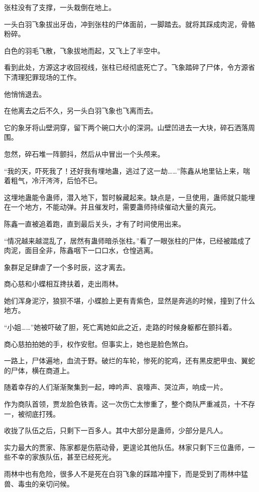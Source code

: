 \begin{this_body}
张柱没有了支撑，一头栽倒在地上。

一头白羽飞象拔出牙齿，冲到张柱的尸体面前，一脚踏去。就将其踩成肉泥，骨骼粉碎。

白色的羽毛飞散，飞象拔地而起，又飞上了半空中。

看到此处，方源这才收回视线，张柱已经彻底死亡了。飞象踏碎了尸体，令方源省下清理犯罪现场的工作。

他悄悄退去。

在他离去之后不久，另一头白羽飞象也飞离而去。

它的象牙将山壁洞穿，留下两个碗口大小的深洞。山壁凹进去一大块，碎石洒落周围。

忽然，碎石堆一阵颤抖，然后从中冒出一个头颅来。

“我的天，吓死我了！还好我有埋地蛊，逃过了这一劫……”陈鑫从地里钻上来，喘着粗气，冷汗涔涔，后怕不已。

这埋地蛊能令蛊师，潜入地下，暂时躲藏起来。缺点是，一旦使用，蛊师就只能埋在一个地方，不能动弹。并且催发时，需要蛊师持续催动大量的真元。

陈鑫一直被追着跑，直到最后关头，才有了时间使用出来。

“情况越来越混乱了，居然有蛊师暗杀张柱。”看了一眼张柱的尸体，已经被踏成了肉泥，面目全非，陈鑫咽下一口口水，仓惶逃离。

象群足足肆虐了一个多时辰，这才离去。

商心慈和小蝶相互搀扶着，走出雨林。

她们浑身泥泞，狼狈不堪，小蝶脸上更有青紫色，显然是奔逃的时候，撞到了什么地方。

“小姐……”她被吓破了胆，死亡离她如此之近，走路的时候身躯都在颤抖着。

商心慈拍拍她的手，权作安慰。但事实上，她也是脸色煞白。

一路上，尸体遍地，血流于野。破烂的车轮，惨死的驼鸡，还有黑皮肥甲虫、翼蛇的尸体，横在商道上。

随着幸存的人们渐渐聚集到一起，呻吟声、哀嚎声、哭泣声，响成一片。

作为商队首领，贾龙脸色铁青。这一次伤亡太惨重了，整个商队严重减员，十不存一，被彻底打残。

收拢了队伍之后，只剩下一百多人。其中大部分是蛊师，少部分是凡人。

实力最大的贾家、陈家都是伤筋动骨，更遑论其他队伍。林家只剩下三位蛊师，一些不幸的家族队伍，甚至已经死光。

雨林中也有危险，很多人不是死在白羽飞象的踩踏冲撞下，而是受到了雨林中猛兽、毒虫的亲切问候。


\end{this_body}
